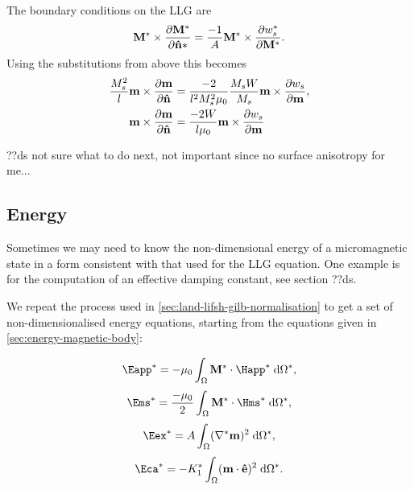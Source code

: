 The boundary conditions on the LLG are
\begin{equation}
  \mathbf{M}^* \times \frac{\partial \mathbf{M}^*}{\partial \mathbf{\hat{n}}*} = \frac{-1}{A} \mathbf{M}^* \times \frac{\partial w_s^*}{\partial \mathbf{M}^*}.
\end{equation}
Using the substitutions from above this becomes
\begin{equation}
  \begin{aligned}
    \frac{M_s^2}{l} \mathbf{m} \times \frac{\partial \mathbf{m}}{\partial \mathbf{\hat{n}}} &= \frac{-2}{l^2 M_s^2 \mu_0} \frac{M_s W}{M_s} \mathbf{m} \times \frac{\partial w_s}{\partial \mathbf{m}}, \\
    \mathbf{m} \times \frac{\partial \mathbf{m}}{\partial \mathbf{\hat{n}}} &= \frac{-2 W}{l \mu_0}  \mathbf{m} \times \frac{\partial w_s}{\partial \mathbf{m}}
  \end{aligned}
\end{equation}

??ds not sure what to do next, not important since no surface anisotropy for me...



\subsection{Energy}
\label{sec:energy-calculations}

Sometimes we may need to know the non-dimensional energy of a micromagnetic state in a form consistent with that used for the LLG equation. One example is for the computation of an effective damping constant, see section ??ds.

We repeat the process used in \autoref{sec:land-lifsh-gilb-normalisation} to get a set of non-dimensionalised energy equations, starting from the equations given in \autoref{sec:energy-magnetic-body}:

\begin{equation*}
  \Eapp^* = - \mu_0 \int_{\magd} \Mv^* \cdot \Happ^* \d \magd^*,
\end{equation*}
\begin{equation}
  \Ems^* =  \frac{-\mu_0}{2} \int_{\magd} \Mv^* \cdot \Hms^* \d \magd^*,
\end{equation}
\begin{equation*}
  \Eex^* =  \Exchc \int_{\magd} (\nabla^* \mv)^2 \d \magd^*,
\end{equation*}
\begin{equation*}
  \Eca^* =  -\Kone^* \int_\magd (\mv \cdot \ev)^2 \d \magd^*.
\end{equation*}


